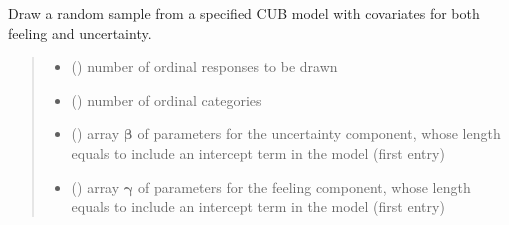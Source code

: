 \documentclass[letterpaper,10pt,english]{sphinxmanual}
\begin{document}

\begin{fulllineitems}
\label{\detokenize{cubmods:cubmods.cub_yw.draw}}
\pysigstartsignatures
{}
\pysigstopsignatures
\sphinxAtStartPar
Draw a random sample from a specified CUB model with covariates for
both feeling and uncertainty.
\begin{quote}\begin{description}
\begin{itemize}
\item {} 
\sphinxAtStartPar
{} () \textendash{} number of ordinal responses to be drawn

\item {} 
\sphinxAtStartPar
{} () \textendash{} number of ordinal categories

\item {} 
\sphinxAtStartPar
{} () \textendash{} array \(\pmb \beta\) of parameters for the uncertainty component, whose length equals 
 to include an intercept term in the model (first entry)

\item {} 
\sphinxAtStartPar
{} () \textendash{} array \(\pmb \gamma\) of parameters for the feeling component, whose length equals 
 to include an intercept term in the model (first entry)


\end{itemize}
\end{description}
\end{quote}
\end{fulllineitems}
\end{document}
